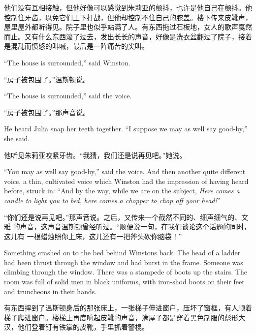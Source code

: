 \begin{paracol}{2}
\switchcolumn

他们没有互相接触，但他好像可以感觉到朱莉亚的颤抖，也许是他自己在颤抖。他控制住牙齿，以免它们上下打战，但他却控制不住自己的膝盖。楼下传来皮靴声，屋里屋外都听得见。院子里也似乎站满了人。有东西拖过石板地，女人的歌声戛然而止。又有什么东西滚了过去，发出长长的声音，好像是洗衣盆翻过了院子，接着是混乱而愤怒的叫喊，最后是一阵痛苦的尖叫。

\switchcolumn*

``The house is surrounded,'' said Winston.

\switchcolumn

``房子被包围了。''温斯顿说。

\switchcolumn*

``The house is surrounded,'' said the voice.

\switchcolumn

``房子被包围了。''那声音说。

\switchcolumn*

He heard Julia snap her teeth together. ``I suppose we may as well say
good-by,'' she said.

\switchcolumn

他听见朱莉亚咬紧牙齿。``我猜，我们还是说再见吧。''她说。

\switchcolumn*

``You may as well say good-by,'' said the voice. And then another quite
different voice, a thin, cultivated voice which Winston had the
impression of having heard before, struck in: ``And by the way, while we
are on the subject, \emph{Here comes a candle to light you to bed, here
comes a chopper to chop off your head!}''

\switchcolumn

``你们还是说再见吧。''那声音说。之后，又传来一个截然不同的、细声细气的、文雅
的声音，这声音温斯顿曾经听过。``顺便说一句，在我们谈论这个话题的同时，这儿有
一根蜡烛照你上床，这儿还有一把斧头砍你脑袋！''

\switchcolumn*

Something crashed on to the bed behind Winston\textquotesingle s back.
The head of a ladder had been thrust through the window and had burst in
the frame. Someone was climbing through the window. There was a stampede
of boots up the stairs. The room was full of solid men in black
uniforms, with iron-shod boots on their feet and truncheons in their
hands.

\switchcolumn

有东西摔到了温斯顿身后的那张床上，一张梯子伸进窗户，压坏了窗框，有人顺着梯子爬进窗户。楼梯上再度响起皮靴的声音，满屋子都是穿着黑色制服的彪形大汉，他们登着钉有铁掌的皮靴，手里抓着警棍。


\end{paracol}
